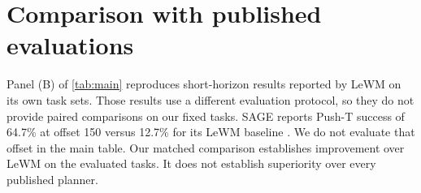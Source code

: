 \documentclass{article}
\theoremstyle{definition}
\theoremstyle{remark}
\begin{document}
\section{Comparison with published evaluations}
\label{app:published}
Panel (B) of \cref{tab:main} reproduces short-horizon results reported by
LeWM \citep{lewm} on its own task sets.
Those results use a different evaluation protocol, so they do not provide paired
comparisons on our fixed tasks.
SAGE reports Push-T success of 64.7\% at offset 150 versus 12.7\% for its LeWM
baseline \citep{sage}. We do not evaluate that offset in the main table.
Our matched comparison establishes improvement over LeWM on the evaluated tasks.
It does not establish superiority over every published planner.
\end{document}
